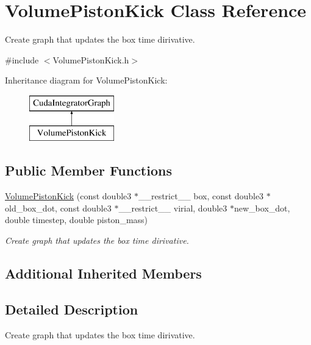 \hypertarget{classVolumePistonKick}{}\section{Volume\+Piston\+Kick Class Reference}
\label{classVolumePistonKick}


Create graph that updates the box time dirivative.  




{\ttfamily \#include $<$Volume\+Piston\+Kick.\+h$>$}

Inheritance diagram for Volume\+Piston\+Kick\+:\begin{figure}[H]
\begin{center}
\leavevmode
\includegraphics[height=2.000000cm]{classVolumePistonKick}
\end{center}
\end{figure}
\subsection*{Public Member Functions}
\begin{DoxyCompactItemize}
\item 
\hyperlink{classVolumePistonKick_adb5bdb93bb01be95881e4aeb5be3d3a7}{Volume\+Piston\+Kick} (const double3 $\ast$\+\_\+\+\_\+restrict\+\_\+\+\_\+ box, const double3 $\ast$old\+\_\+box\+\_\+dot, const double3 $\ast$\+\_\+\+\_\+restrict\+\_\+\+\_\+ virial, double3 $\ast$new\+\_\+box\+\_\+dot, double timestep, double piston\+\_\+mass)
\begin{DoxyCompactList}\small\item\em Create graph that updates the box time dirivative. \end{DoxyCompactList}\end{DoxyCompactItemize}
\subsection*{Additional Inherited Members}


\subsection{Detailed Description}
Create graph that updates the box time dirivative. 




